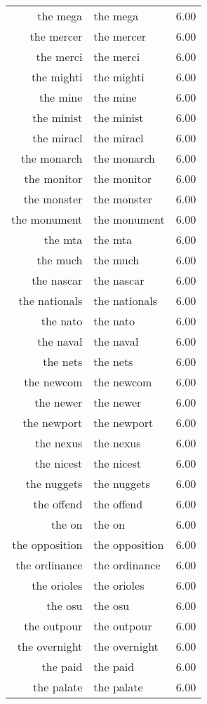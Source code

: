 \begin{table}[ht]
\begin{tabular}{rlr}
  the mega & the mega & 6.00 \\ 
  the mercer & the mercer & 6.00 \\ 
  the merci & the merci & 6.00 \\ 
  the mighti & the mighti & 6.00 \\ 
  the mine & the mine & 6.00 \\ 
  the minist & the minist & 6.00 \\ 
  the miracl & the miracl & 6.00 \\ 
  the monarch & the monarch & 6.00 \\ 
  the monitor & the monitor & 6.00 \\ 
  the monster & the monster & 6.00 \\ 
  the monument & the monument & 6.00 \\ 
  the mta & the mta & 6.00 \\ 
  the much & the much & 6.00 \\ 
  the nascar & the nascar & 6.00 \\ 
  the nationals & the nationals & 6.00 \\ 
  the nato & the nato & 6.00 \\ 
  the naval & the naval & 6.00 \\ 
  the nets & the nets & 6.00 \\ 
  the newcom & the newcom & 6.00 \\ 
  the newer & the newer & 6.00 \\ 
  the newport & the newport & 6.00 \\ 
  the nexus & the nexus & 6.00 \\ 
  the nicest & the nicest & 6.00 \\ 
  the nuggets & the nuggets & 6.00 \\ 
  the offend & the offend & 6.00 \\ 
  the on & the on & 6.00 \\ 
  the opposition & the opposition & 6.00 \\ 
  the ordinance & the ordinance & 6.00 \\ 
  the orioles & the orioles & 6.00 \\ 
  the osu & the osu & 6.00 \\ 
  the outpour & the outpour & 6.00 \\ 
  the overnight & the overnight & 6.00 \\ 
  the paid & the paid & 6.00 \\ 
  the palate & the palate & 6.00 \\ 

\end{tabular}
\end{table}
